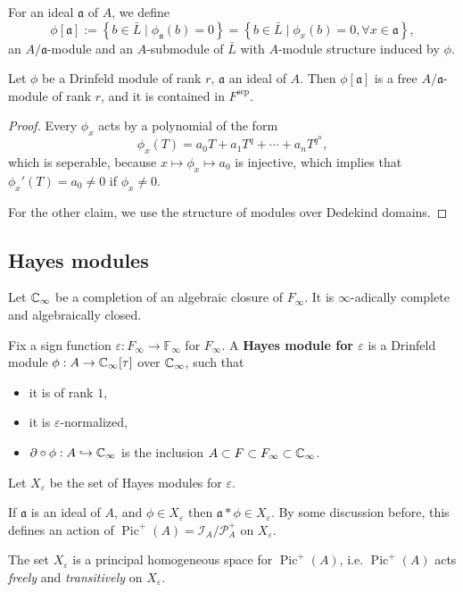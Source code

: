 \documentclass{article}
\newcommand{\F}{\mathbb{F}}
\newcommand{\sep}{\mathrm{sep}}
\DeclareMathOperator{\pic}{Pic}
\begin{document}
For an ideal $\mathfrak{a}$ of $A$,
we define \[\phi[\mathfrak{a}] := \left\{b\in\bar L\mid \phi_\mathfrak{a}(b) = 0\right\} = \left\{ b\in\bar L\mid \phi_x(b) = 0,\forall x\in\mathfrak{a} \right\},\]
an $A/\mathfrak{a}$-module and an $A$-submodule of $\bar L$ with $A$-module structure induced by $\phi$.

\begin{proposition}\label{torsion submodule of an ideal}
    Let $\phi$ be a Drinfeld module of rank $r$,
    $\mathfrak{a}$ an ideal of $A$.
    Then $\phi[\mathfrak{a}]$ is a free $A/\mathfrak{a}$-module of rank $r$,
    and it is contained in $F^\sep$.
\end{proposition}
\begin{proof}
    Every $\phi_x$ acts by a polynomial of the form\[\phi_x(T) = a_0T + a_1T^q + \cdots + a_nT^{q^n},\]
    which is seperable, because $x\mapsto \phi_x\mapsto a_0$ is injective, which implies that $\phi_x'(T) = a_0\ne 0$ if $\phi_x \ne 0$.

    For the other claim, we use the structure of modules over Dedekind domains.
\end{proof}



\subsection{Hayes modules}

Let $\mathbb{C}_\infty$ be a completion of an algebraic closure of $F_\infty$.
It is $\infty$-adically complete and algebraically closed.

Fix a sign function $\varepsilon : F_\infty\to\F_\infty$ for $F_\infty$.
A \textbf{Hayes module for $\varepsilon$}
is a Drinfeld module $\phi : A\to \mathbb{C}_\infty[\tau]$ over $\mathbb{C}_\infty$,
such that\begin{itemize}
\item it is of rank $1$,
\item it is $\varepsilon$-normalized,
\item $\partial\circ\phi : A\hookrightarrow\mathbb{C}_\infty$ is the inclusion $A\subset F\subset F_\infty\subset \mathbb{C}_\infty$.
\end{itemize}
Let $X_\varepsilon$ be the set of Hayes modules for $\varepsilon$.


If $\mathfrak{a}$ is an ideal of $A$, and $\phi\in X_\varepsilon$
then $\mathfrak{a}*\phi\in X_\varepsilon$.
By some discussion before,
this defines an action of $\pic^+(A) = \mathcal{I}_A/\mathcal{P}^+_A$
on $X_\varepsilon$.
\begin{proposition}\label{action of Pic+ on the set of Hayes modules}
    The set $X_\varepsilon$ is a principal homogeneous space for $\pic^+(A)$, i.e. $\pic^+(A)$ acts \textit{freely} and \textit{transitively} on $X_\varepsilon$.
\end{proposition}
\end{document}
